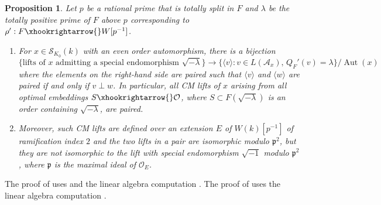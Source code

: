 \documentclass{amsart}
\numberwithin{equation}{subsection}
\numberwithin{theorem}{section}
\newtheorem{proposition}[theorem]{Proposition}
\theoremstyle{definition}
\theoremstyle{remark}
\newcommand{\cA}{\mathcal{A}}
\newcommand{\cO}{\mathcal{O}}
\newcommand{\fp}{\mathfrak{p}}
\DeclareMathOperator{\Aut}{Aut}
\begin{document}
\begin{proposition}\label{lem:pairingwithauto}
    Let $p$ be a rational prime that is totally split in $F$ and $\lambda$ be the totally positive prime of $F$ above $p$ corresponding to $\rho': F\xhookrightarrow{}W[p^{-1}]$. \begin{enumerate} 
    \item For $x\in \mathscr{S}_{K_0}(k)$ with an even order automorphism, there is a bijection $$\{\text{lifts of }x \text{ admitting a special endomorphism }\sqrt{-\lambda}\}\longrightarrow \{\langle v\rangle: v\in L(\cA_x), \, Q_F'(v) = \lambda\}/\Aut(x) $$ where the elements on the right-hand side are paired such that $\langle v\rangle$ and $\langle w\rangle$ are paired if and only if $v\perp w$. In particular, all CM lifts of $x$ arising from all optimal embeddings $S\xhookrightarrow{} \cO$, where $S\subset F(\sqrt{-\lambda})$ is an order containing $\sqrt{-\lambda}$, are paired. 
    \item Moreover, such CM lifts are defined over an extension $E$ of $W(k)[p^{-1}]$ of ramification index $2$ and the two lifts in a pair are isomorphic modulo $\fp^2$, but they are not isomorphic to the lift with special endomorphism $\sqrt{-1}$ modulo $\fp^2$, where $\fp$ is the maximal ideal of $\cO_E$. 
    \end{enumerate}
\end{proposition}

The proof of  uses  and the linear algebra computation . The proof of  uses the linear algebra computation . 
\end{document}
